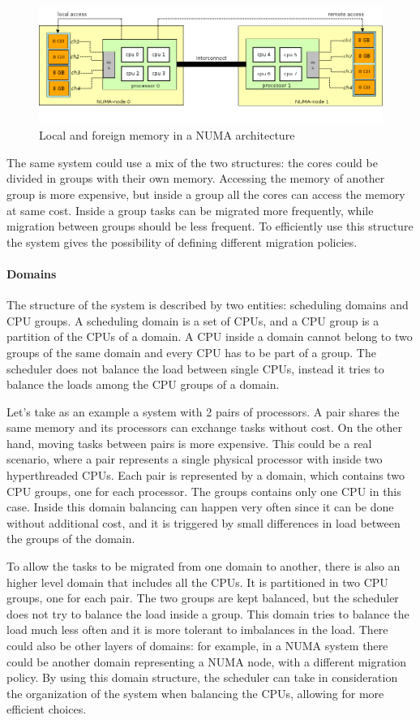 \begin{figure}[ht]
\includegraphics[width=\textwidth]{images/numa.png}
\caption{Local and foreign memory in a NUMA architecture}
\label{img:numa}
\end{figure}
The same system could use a mix of the two structures: the cores could be divided in groups with their own memory. Accessing the memory of another group is more expensive, but inside a group all the cores can access the memory at same cost. Inside a group tasks can be migrated more frequently, while migration between groups should be less frequent. To efficiently use this structure the system gives the possibility of defining different migration policies.

\paragraph{Domains} %
The structure of the system is described by two entities: scheduling domains and CPU groups. A scheduling domain is a set of CPUs, and a CPU group is a partition of the CPUs of a domain. A CPU inside a domain cannot belong to two groups of the same domain and every CPU has to be part of a group. The scheduler does not balance the load between single CPUs, instead it tries to balance the loads among the CPU groups of a domain.

Let's take as an example a system with 2 pairs of processors. A pair shares the same memory and its processors can exchange tasks without cost. On the other hand, moving tasks between pairs is more expensive. This could be a real scenario, where a pair represents a single physical processor with inside two hyperthreaded CPUs. Each pair is represented by a domain, which contains two CPU groups, one for each processor. The groups contains only one CPU in this case. Inside this domain balancing can happen very often since it can be done without additional cost, and it is triggered by small differences in load between the groups of the domain.

To allow the tasks to be migrated from one domain to another, there is also an higher level domain that includes all the CPUs. It is partitioned in two CPU groups, one for each pair. The two groups are kept balanced, but the scheduler does not try to balance the load inside a group. This domain tries to balance the load much less often and it is more tolerant to imbalances in the load. There could also be other layers of domains: for example, in a NUMA system there could be another domain representing a NUMA node, with a different migration policy. By using this domain structure, the scheduler can take in consideration the organization of the system when balancing the CPUs, allowing for more efficient choices.